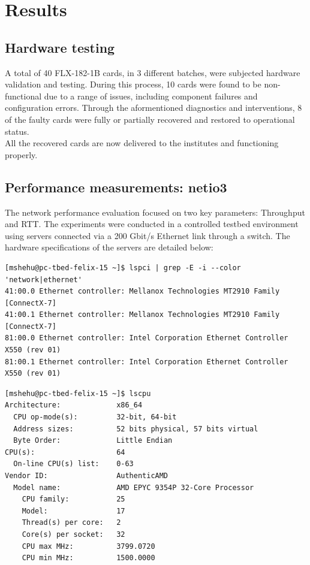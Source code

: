 \chapter{Results}

\section{Hardware testing}

A total of 40 FLX-182-1B cards, in 3 different batches, were subjected hardware validation and testing. During this process, 10 cards were found to be non-functional due to a range of issues, including component failures and configuration errors. Through the aformentioned diagnostics and interventions, 8 of the faulty cards were fully or partially recovered and restored to operational status.\\
All the recovered cards are now delivered to the institutes and functioning properly.

\section{Performance measurements: netio3}
\label{sec:netio3-perf}
The network performance evaluation focused on two key parameters: Throughput and \ac{RTT}. The experiments were conducted in a controlled testbed environment using servers connected via a 200 Gbit/s Ethernet link through a switch. The hardware specifications of the servers are detailed below:

\clearpage
\begin{lstlisting}[caption={Network interface information}, label={lst:network}]
[mshehu@pc-tbed-felix-15 ~]$ lspci | grep -E -i --color 'network|ethernet'
41:00.0 Ethernet controller: Mellanox Technologies MT2910 Family [ConnectX-7]
41:00.1 Ethernet controller: Mellanox Technologies MT2910 Family [ConnectX-7]
81:00.0 Ethernet controller: Intel Corporation Ethernet Controller X550 (rev 01)
81:00.1 Ethernet controller: Intel Corporation Ethernet Controller X550 (rev 01)
\end{lstlisting}

\begin{lstlisting}[caption={CPU information}, label={lst:cpu}, float=htbp]
[mshehu@pc-tbed-felix-15 ~]$ lscpu
Architecture:             x86_64
  CPU op-mode(s):         32-bit, 64-bit
  Address sizes:          52 bits physical, 57 bits virtual
  Byte Order:             Little Endian
CPU(s):                   64
  On-line CPU(s) list:    0-63
Vendor ID:                AuthenticAMD
  Model name:             AMD EPYC 9354P 32-Core Processor
    CPU family:           25
    Model:                17
    Thread(s) per core:   2
    Core(s) per socket:   32
    CPU max MHz:          3799.0720
    CPU min MHz:          1500.0000
\end{lstlisting}


